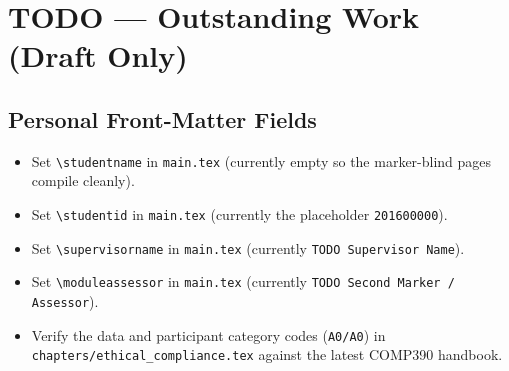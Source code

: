 %
%
%
\chapter*{TODO --- Outstanding Work (Draft Only)}
\thispagestyle{anonymous}

\begin{center}
\end{center}

\section*{Personal Front-Matter Fields}

\begin{itemize}
    \item Set \texttt{\textbackslash studentname} in \texttt{main.tex}
        (currently empty so the marker-blind pages compile cleanly).
    \item Set \texttt{\textbackslash studentid} in \texttt{main.tex}
        (currently the placeholder \texttt{201600000}).
    \item Set \texttt{\textbackslash supervisorname} in
        \texttt{main.tex} (currently \texttt{TODO Supervisor Name}).
    \item Set \texttt{\textbackslash moduleassessor} in
        \texttt{main.tex} (currently
        \texttt{TODO Second Marker / Assessor}).
    \item Verify the data and participant category codes
        (\texttt{A0/A0}) in \texttt{chapters/ethical\_compliance.tex}
        against the latest COMP390 handbook.
\end{itemize}

